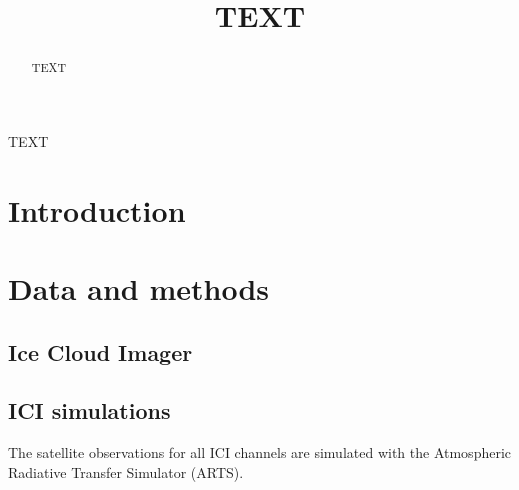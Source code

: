 \documentclass[amt, manuscript]{copernicus}
\begin{document}
\title{TEXT}



\Author[]{}{}
\Author[]{}{}
\Author[]{}{}












\maketitle



\begin{abstract}
TEXT
\end{abstract}




\introduction  %
TEXT
\section{Introduction}

\section{Data and methods}
\subsection{Ice Cloud Imager}


\subsection{ICI simulations}
%
The satellite observations for all ICI channels are simulated with the Atmospheric Radiative Transfer Simulator (ARTS).   
\end{document}
